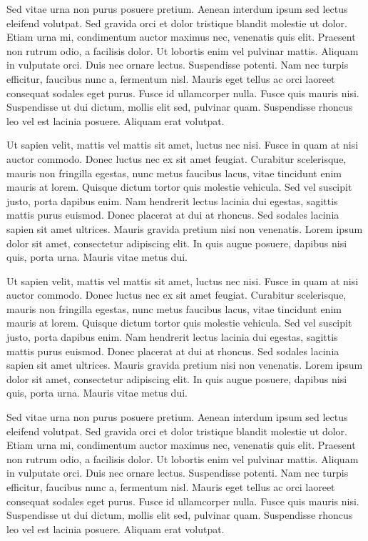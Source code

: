 \documentclass{article}
\newcommand{\voiceshrink}{-5mm}
\newenvironment{MC}
               {\begin{tcolorbox}[enhanced,
                     breakable,
                     parbox=false,
                     colback=voice-bg,
                     colframe=voice-frame,
                     grow to left by=\voiceshrink,
                     attach boxed title to top right={xshift=-5mm,
                       yshift=-3mm,
                       yshifttext=-1mm},
                     coltitle=black,
                     colbacktitle=voice-title-bg,
                     title=MC,
                     boxed title style={size=small,
                       colframe=black}]}
               {\end{tcolorbox}}
\begin{document}
\begin{MC}

Sed vitae urna non purus posuere pretium. Aenean interdum ipsum sed lectus eleifend volutpat. Sed gravida orci et dolor tristique blandit molestie ut dolor. Etiam urna mi, condimentum auctor maximus nec, venenatis quis elit. Praesent non rutrum odio, a facilisis dolor. Ut lobortis enim vel pulvinar mattis. Aliquam in vulputate orci. Duis nec ornare lectus. Suspendisse potenti. Nam nec turpis efficitur, faucibus nunc a, fermentum nisl. Mauris eget tellus ac orci laoreet consequat sodales eget purus. Fusce id ullamcorper nulla. Fusce quis mauris nisi. Suspendisse ut dui dictum, mollis elit sed, pulvinar quam. Suspendisse rhoncus leo vel est lacinia posuere. Aliquam erat volutpat.

Ut sapien velit, mattis vel mattis sit amet, luctus nec nisi. Fusce in quam at nisi auctor commodo. Donec luctus nec ex sit amet feugiat. Curabitur scelerisque, mauris non fringilla egestas, nunc metus faucibus lacus, vitae tincidunt enim mauris at lorem. Quisque dictum tortor quis molestie vehicula. Sed vel suscipit justo, porta dapibus enim. Nam hendrerit lectus lacinia dui egestas, sagittis mattis purus euismod. Donec placerat at dui at rhoncus. Sed sodales lacinia sapien sit amet ultrices. Mauris gravida pretium nisi non venenatis. Lorem ipsum dolor sit amet, consectetur adipiscing elit. In quis augue posuere, dapibus nisi quis, porta urna. Mauris vitae metus dui.

Ut sapien velit, mattis vel mattis sit amet, luctus nec nisi. Fusce in quam at nisi auctor commodo. Donec luctus nec ex sit amet feugiat. Curabitur scelerisque, mauris non fringilla egestas, nunc metus faucibus lacus, vitae tincidunt enim mauris at lorem. Quisque dictum tortor quis molestie vehicula. Sed vel suscipit justo, porta dapibus enim. Nam hendrerit lectus lacinia dui egestas, sagittis mattis purus euismod. Donec placerat at dui at rhoncus. Sed sodales lacinia sapien sit amet ultrices. Mauris gravida pretium nisi non venenatis. Lorem ipsum dolor sit amet, consectetur adipiscing elit. In quis augue posuere, dapibus nisi quis, porta urna. Mauris vitae metus dui.

Sed vitae urna non purus posuere pretium. Aenean interdum ipsum sed lectus eleifend volutpat. Sed gravida orci et dolor tristique blandit molestie ut dolor. Etiam urna mi, condimentum auctor maximus nec, venenatis quis elit. Praesent non rutrum odio, a facilisis dolor. Ut lobortis enim vel pulvinar mattis. Aliquam in vulputate orci. Duis nec ornare lectus. Suspendisse potenti. Nam nec turpis efficitur, faucibus nunc a, fermentum nisl. Mauris eget tellus ac orci laoreet consequat sodales eget purus. Fusce id ullamcorper nulla. Fusce quis mauris nisi. Suspendisse ut dui dictum, mollis elit sed, pulvinar quam. Suspendisse rhoncus leo vel est lacinia posuere. Aliquam erat volutpat.


\end{MC}
\end{document}
